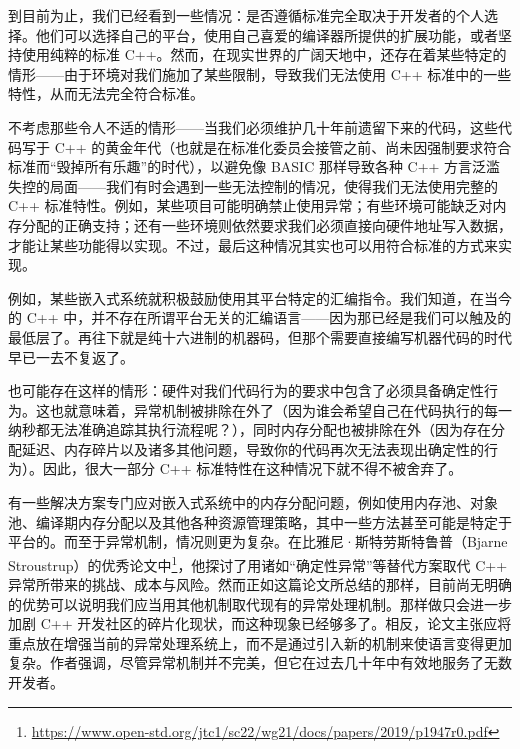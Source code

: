到目前为止，我们已经看到一些情况：是否遵循标准完全取决于开发者的个人选择。他们可以选择自己的平台，使用自己喜爱的编译器所提供的扩展功能，或者坚持使用纯粹的标准 C++。然而，在现实世界的广阔天地中，还存在着某些特定的情形——由于环境对我们施加了某些限制，导致我们无法使用 C++ 标准中的一些特性，从而无法完全符合标准。

不考虑那些令人不适的情形——当我们必须维护几十年前遗留下来的代码，这些代码写于 C++ 的黄金年代（也就是在标准化委员会接管之前、尚未因强制要求符合标准而“毁掉所有乐趣”的时代），以避免像 BASIC 那样导致各种 C++ 方言泛滥失控的局面——我们有时会遇到一些无法控制的情况，使得我们无法使用完整的 C++ 标准特性。例如，某些项目可能明确禁止使用异常；有些环境可能缺乏对内存分配的正确支持；还有一些环境则依然要求我们必须直接向硬件地址写入数据，才能让某些功能得以实现。不过，最后这种情况其实也可以用符合标准的方式来实现。

例如，某些嵌入式系统就积极鼓励使用其平台特定的汇编指令。我们知道，在当今的 C++ 中，并不存在所谓平台无关的汇编语言——因为那已经是我们可以触及的最低层了。再往下就是纯十六进制的机器码，但那个需要直接编写机器代码的时代早已一去不复返了。

也可能存在这样的情形：硬件对我们代码行为的要求中包含了必须具备确定性行为。这也就意味着，异常机制被排除在外了（因为谁会希望自己在代码执行的每一纳秒都无法准确追踪其执行流程呢？），同时内存分配也被排除在外（因为存在分配延迟、内存碎片以及诸多其他问题，导致你的代码再次无法表现出确定性的行为）。因此，很大一部分 C++ 标准特性在这种情况下就不得不被舍弃了。

有一些解决方案专门应对嵌入式系统中的内存分配问题，例如使用内存池、对象池、编译期内存分配以及其他各种资源管理策略，其中一些方法甚至可能是特定于平台的。而至于异常机制，情况则更为复杂。在比雅尼·斯特劳斯特鲁普（Bjarne Stroustrup）的优秀论文中\footnote{\url{https://www.open-std.org/jtc1/sc22/wg21/docs/papers/2019/p1947r0.pdf}}，他探讨了用诸如“确定性异常”等替代方案取代 C++ 异常所带来的挑战、成本与风险。然而正如这篇论文所总结的那样，目前尚无明确的优势可以说明我们应当用其他机制取代现有的异常处理机制。那样做只会进一步加剧 C++ 开发社区的碎片化现状，而这种现象已经够多了。相反，论文主张应将重点放在增强当前的异常处理系统上，而不是通过引入新的机制来使语言变得更加复杂。作者强调，尽管异常机制并不完美，但它在过去几十年中有效地服务了无数开发者。

























